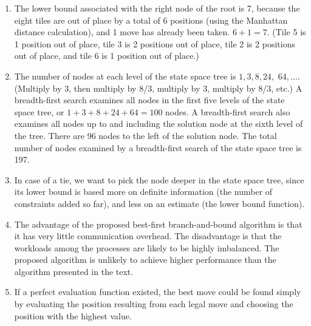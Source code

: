 \begin{enumerate}
      Another way to avoid falling into an infinite cycle 
      is to use iterative deepening; i.e., limiting the search
      to a certain depth.
      First we perform backtrack search to a fixed level $d$.
      If no solution is found, we perform a backtrack search to level $d+1$.
      We continue in this fashion until a solution is found.

\item The lower bound associated with the right node of the root is 7,
      because the eight tiles are out of place by a total of 6 positions
      (using the Manhattan distance calculation), and 1 move has already
      been taken. $6 + 1 = 7$.
      (Tile 5 is 1 position out of place, tile 3 is 2 positions out of place,
      tile 2 is 2 positions out of place, and tile 6 is 1 position out of
      place.)

\item The number of nodes at each level of the state space tree is
      $1, 3, 8, 24,$ $64, \ldots$.
      (Multiply by 3, then multiply by 8/3,
      multiply by 3, multiply by 8/3, etc.)
      A breadth-first search examines all nodes in the first five
      levels of the state space tree, or $1 + 3 + 8 + 24 + 64 = 100$ nodes.
      A breadth-first search also examines all nodes up to and including the
      solution node at the sixth level of the tree.
      There are 96 nodes to the left of the solution node.
      The total number of nodes examined by a breadth-first search of the
      state space tree is 197.

\item In case of a tie, we want to pick the node deeper in the state space
      tree, since its lower bound is based more on definite information
      (the number of constraints added so far), and less on an estimate
      (the lower bound function).

\item The advantage of the proposed best-first branch-and-bound algorithm is
      that it has very little communication overhead. The disadvantage is that
      the workloads among the processes are likely to be highly imbalanced.
      The proposed algorithm is unlikely to achieve higher performance than
      the algorithm presented in the text.

\item If a perfect evaluation function existed, the best move could be found
      simply by evaluating the position resulting from each legal move and
      choosing the position with the highest value.


\end{enumerate}
